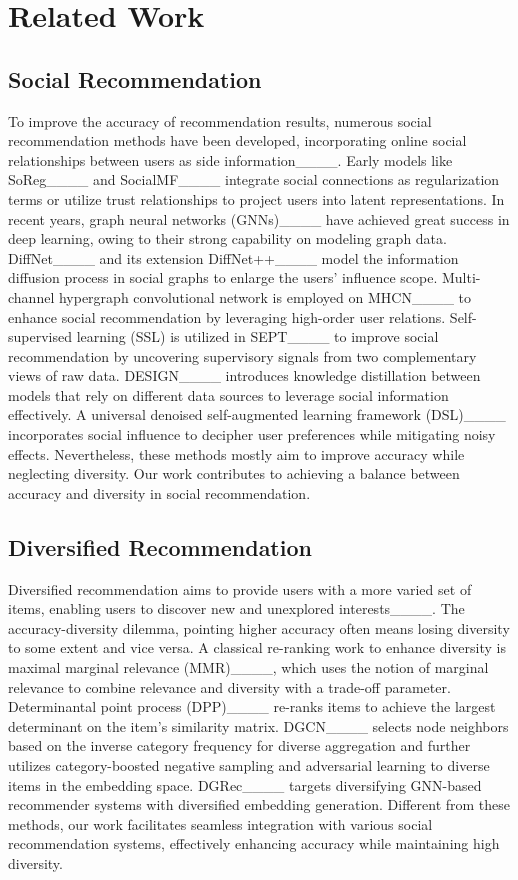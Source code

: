 \section{Related Work}
\subsection{Social Recommendation}
To improve the accuracy of recommendation results, numerous social recommendation methods have been developed, incorporating online social relationships between users as side information____. Early models like SoReg____ and SocialMF____ integrate social connections as regularization terms or utilize trust relationships to project users into latent representations. In recent years, graph neural networks (GNNs)____ have achieved great success in deep learning, owing to their strong capability on modeling graph data. DiffNet____ and its extension DiffNet++____ model the information diffusion process in social graphs to enlarge the users’ influence scope. Multi-channel hypergraph convolutional network is employed on MHCN____ to enhance social recommendation by leveraging high-order user relations. Self-supervised learning (SSL) is utilized in SEPT____ to improve social recommendation by uncovering supervisory signals from two complementary views of raw data. DESIGN____ introduces knowledge distillation between models that rely on different data sources to leverage social information effectively. A universal denoised self-augmented learning framework (DSL)____ incorporates social influence to decipher user preferences while mitigating noisy effects. Nevertheless, these methods mostly aim to improve accuracy while neglecting diversity. Our work contributes to achieving a balance between accuracy and diversity in social recommendation.
 
\subsection{Diversified Recommendation}
Diversified recommendation aims to provide users with a more varied set of items, enabling users to discover new and unexplored interests____. The accuracy-diversity dilemma, pointing higher accuracy often means losing diversity to some extent and vice versa. A classical re-ranking work to enhance diversity is maximal marginal relevance (MMR)____, which uses the notion of marginal relevance to combine relevance and diversity with a trade-off parameter. Determinantal point process (DPP)____ re-ranks items to achieve the largest determinant on the item’s similarity matrix. DGCN____ selects node neighbors based on the inverse category frequency for diverse aggregation and further utilizes category-boosted negative sampling and adversarial learning to diverse items in the embedding space. DGRec____ targets diversifying GNN-based recommender systems with diversified embedding generation. Different from these methods, our work facilitates seamless integration with various social recommendation systems, effectively enhancing accuracy while maintaining high diversity.